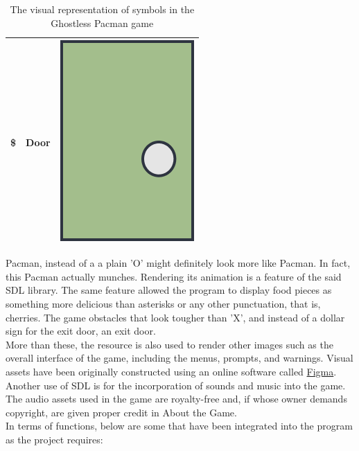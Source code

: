 \begin{table}[H]
\begin{tabular}{ c c c }
        \$ & Door & \includegraphics[scale=0.1]{assets/door_sample.png}\\
        \hline
    \end{tabular}
    \caption{The visual representation of symbols in the Ghostless Pacman game}
    \label{tab:1}
\end{table}

Pacman, instead of a a plain 'O' might definitely look more like Pacman. In fact, this Pacman actually munches. Rendering its animation is a feature of the said SDL
library. The same feature allowed the program to display food pieces as
something more delicious than asterisks or any other punctuation, that is,
cherries. The game obstacles that look tougher than 'X', and instead of a dollar
sign for the exit door, an exit door.\\

More than these, the resource is also used to render other images such as the overall interface of the game, including the menus, prompts, and warnings. Visual assets have been originally constructed using an online software called \href{https://www.figma.com/}{Figma}.\\

Another use of SDL is for the incorporation of sounds and music into the game. The audio assets used in the game are royalty-free and, if whose owner demands copyright, are given proper credit in About the Game.\\

In terms of functions, below are some that have been integrated into the program as the project requires:

